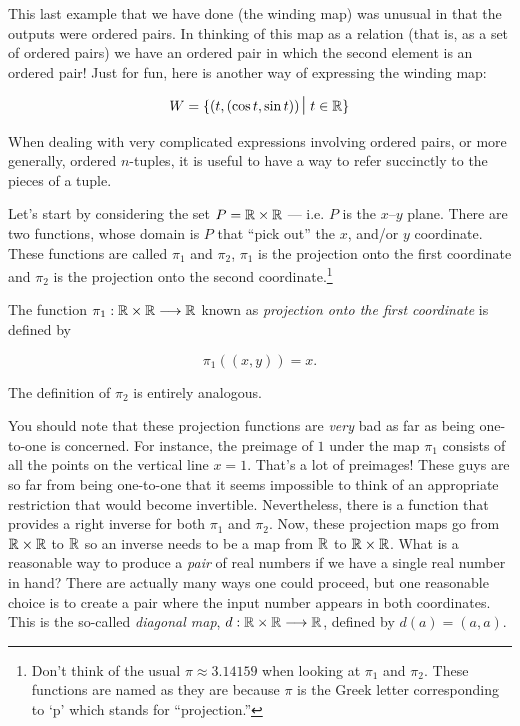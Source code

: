 This last example that we have done (the winding map) was unusual in that
the outputs were ordered pairs.  In thinking of this map as a relation
(that is, as a set of ordered pairs) we have an ordered pair in which 
the second element is an ordered pair!  Just for fun, here is another 
way of expressing the winding map:

\[ W = \{ (t, (\cos{t}, \sin{t})) \suchthat \, t \in \Reals \} \]

When dealing with very complicated expressions involving ordered
pairs, or more generally, ordered $n$-tuples, it is useful to 
have a way to refer succinctly to the pieces of a tuple.

Let's start by considering the set $P = {\mathbb R} \times {\mathbb R}$ --- i.e. 
$P$ is the $x$--$y$ plane.  There are two functions, whose domain is $P$
that ``pick out'' the $x$, and/or $y$ coordinate.  These functions are
called $\pi_1$ and $\pi_2$, $\pi_1$ is the projection onto the first
coordinate and $\pi_2$ is the projection onto the second coordinate.\footnote{%
Don't think of the usual $\pi \approx 3.14159$ when looking at $\pi_1$ and %
$\pi_2$.  These functions are named as they are because $\pi$ is the Greek %
letter corresponding to `p' which stands for ``projection.''}

\begin{defi}
The function $\pi_1: {\mathbb R} \times {\mathbb R} \longrightarrow {\mathbb R}$ known
as \emph{projection onto the first coordinate} is
defined by

\[ \pi_1((x,y)) = x. \]
 
\end{defi}

The definition of $\pi_2$ is entirely analogous.  

You should note that these projection functions are \emph{very} bad 
as far as being one-to-one is concerned.  For instance, the preimage
of $1$ under the map $\pi_1$ consists of all the points on the vertical line
$x=1$.  That's a lot of preimages!  These guys are so far from being 
one-to-one that it seems impossible to think of an appropriate restriction
that would become invertible.  Nevertheless, there is a function that 
provides a right inverse for both $\pi_1$ and $\pi_2$.  Now, these projection
maps go from ${\mathbb R} \times {\mathbb R}$ to ${\mathbb R}$ so an inverse needs to be
a map from ${\mathbb R}$ to ${\mathbb R} \times {\mathbb R}$.  What is a reasonable way to
produce a \emph{pair} of real numbers if we have a single real number in hand?
There are actually many ways one could proceed, but one reasonable choice is
to create a pair where the input number appears in both coordinates.  This
is the so-called \emph{diagonal map}, 
$d:{\mathbb R} \times {\mathbb R} \longrightarrow {\mathbb R}$, defined by $d(a) = (a,a)$.

